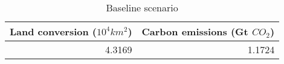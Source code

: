 \begin{table}
\centering
\caption{\label{tab:tab:baseline}Baseline scenario}
\centering
\begin{tabular}[t]{rr}
\midrule\midrule
Land conversion ($10^4 km^2$) & Carbon emissions (Gt $CO_2$)\\
\midrule
4.3169 & 1.1724\\
\bottomrule
\end{tabular}
\end{table}
